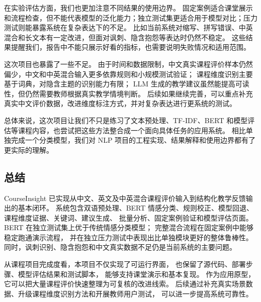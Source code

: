 在实验评估方面，我们也更加注意不同结果的使用边界。
固定案例适合课堂展示和流程检查，但不能代表模型的泛化能力；独立测试集更适合用于模型对比；压力测试则能暴露系统在复杂表达下的不足。
比如当前系统对缩写、拼写错误、中英混合和长文本有一定改进，但面对讽刺、隐含抱怨等表达时仍然不稳定。
这些结果提醒我们，报告中不能只展示好看的指标，也需要说明失败情况和适用范围。

这次项目也暴露了一些不足。
由于时间和数据限制，中文真实课程评价样本仍然偏少，中文和中英混合输入更多依靠规则和小规模测试验证；
课程维度识别主要基于词典，对隐含主题的识别能力有限；
LLM 生成的教学建议虽然能提高可读性，但仍然需要教师根据真实教学情境判断。
后续如果继续完善，可以重点补充真实中文评价数据，改进维度标注方式，并对复杂表达进行更系统的测试。

总体来说，这次项目让我们不只是练习了文本预处理、TF-IDF、BERT 和模型评估等课程内容，也尝试把这些方法整合成一个面向具体任务的应用系统。
相比单独完成一个分类模型，我们对 NLP 项目的工程实现、结果解释和使用边界都有了更实际的理解。

\subsection{总结}

CourseInsight 已实现从中文、英文及中英混合课程评价输入到结构化教学反馈输出的基本闭环。
系统包含双语预处理、BERT 情感分类、规则校正、模型回退、课程维度证据、关键词、建议生成、
批量分析、固定案例验证和模型评估页面。
BERT 在独立测试集上优于传统情感分类模型；
完整混合流程在固定案例中能够稳定跑通演示流程，
并在独立压力测试中表现出比单独模块更好的整体鲁棒性。
同时，讽刺识别、隐含抱怨和中文真实数据不足仍是当前系统的主要问题。

从课程项目完成度看，本项目不仅实现了可运行界面，
也保留了源代码、部署步骤、模型评估结果和测试脚本，
能够支持课堂演示和基本复现。
作为应用原型，它可以把大量课程评价快速整理为可复核的改进线索。
后续通过补充真实场景数据、升级课程维度识别方法和开展教师用户测试，
可以进一步提高系统可靠性。
